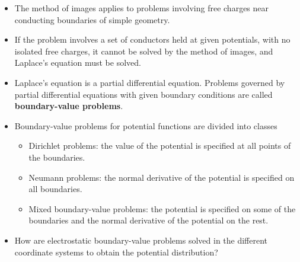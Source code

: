 \ELhold


\begin{ELunit}


\begin{itemize}
\tightlist
\item
  The method of images applies to problems involving free charges near conducting boundaries of simple geometry.
\item
  If the problem involves a set of conductors held at given potentials, with no isolated free charges, it cannot be solved by the method of images, and Laplace's equation must be solved.
\item
  Laplace's equation is a partial differential equation. Problems governed by partial differential equations with given boundary conditions are called \textbf{boundary-value problems}.
\item
  Boundary-value problems for potential functions are divided into classes

  \begin{itemize}
  \tightlist
  \item
    Dirichlet problems: the value of the potential is specified at all points of the boundaries.
  \item
    Neumann problems: the normal derivative of the potential is specified on all boundaries.
  \item
    Mixed boundary-value problems: the potential is specified on some of the boundaries and the normal derivative of the potential on the rest.
  \end{itemize}
\item
  How are electrostatic boundary-value problems solved in the different coordinate systems to obtain the potential distribution?
\end{itemize}

\end{ELunit}

\ELhold



